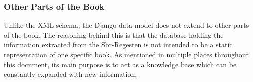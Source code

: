 \subsubsection{Other Parts of the Book}
\label{sec:other-model}

Unlike the XML schema, the Django data model does not extend to other
parts of the book. The reasoning behind this is that the database
holding the information extracted from the Sbr-Regesten is not
intended to be a static representation of one specific book. As
mentioned in multiple places throughout this document, its main
purpose is to act as a knowledge base which can be constantly expanded
with new information.
